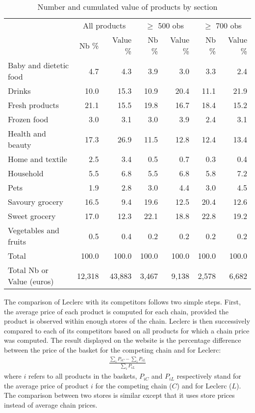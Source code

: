 \documentclass[english]{article}
\begin{document}
\begin{table}
\caption{Number and cumulated value of products by section}
\label{tab:qlmc_sections}
\begin{tabular}{lrr|rr|rr}
\toprule
\toprule
& \multicolumn{2}{c|}{All products} & \multicolumn{2}{c|}{$\ge$ 500 obs} & \multicolumn{2}{c}{$\ge$ 700 obs} \\
& Nb \% & Value \% & Nb \% & Value \% & Nb \% & Value \% \\
\midrule
    Baby and dietetic food & 4.7   & 4.3   & 3.9   & 3.0   & 3.3   & 2.4 \\
    Drinks & 10.0  & 15.3  & 10.9  & 20.4  & 11.1  & 21.9 \\
    Fresh products & 21.1  & 15.5  & 19.8  & 16.7  & 18.4  & 15.2 \\
    Frozen food & 3.0   & 3.1   & 3.0   & 3.9   & 2.4   & 3.1 \\
    Health and beauty & 17.3  & 26.9  & 11.5  & 12.8  & 12.4  & 13.4 \\
    Home and textile & 2.5   & 3.4   & 0.5   & 0.7   & 0.3   & 0.4 \\
    Household & 5.5   & 6.8   & 5.5   & 6.8   & 5.8   & 7.2 \\
    Pets  & 1.9   & 2.8   & 3.0   & 4.4   & 3.0   & 4.5 \\
    Savoury grocery & 16.5  & 9.4   & 19.6  & 12.5  & 20.4  & 12.6 \\
    Sweet grocery & 17.0  & 12.3  & 22.1  & 18.8  & 22.8  & 19.2 \\
    Vegetables and fruits & 0.5   & 0.4   & 0.2   & 0.2   & 0.2   & 0.2 \\
\midrule
    Total & 100.0 & 100.0 & 100.0 & 100.0 & 100.0 & 100.0 \\
    Total Nb or Value (euros) & 12,318 & 43,883 & 3,467 & 9,138 & 2,578 & 6,682 \\
\bottomrule
\bottomrule
\end{tabular}
\end{table}

The comparison of Leclerc with its competitors follows two simple steps. First, the average price of each product is computed for each chain, provided the product is observed within enough stores of the chain. Leclerc is then successively compared to each of its competitors based on all products for which a chain price was computed. The result displayed on the website is the percentage difference between the price of the basket for the competing chain and for Leclerc:
\begin{align*}
\frac{\sum\limits_{i} P_{iC} - \sum\limits_{i} P_{iL}}{\sum\limits_{i} P_{iL}}
\end{align*}
where $i$ refers to all products in the baskets, $P_{iC}$ and $P_{iL}$ respectively stand for the average price of product $i$ for the competing chain ($C$) and for Leclerc ($L$). The comparison between two stores is similar except that it uses store prices instead of average chain prices.
\end{document}
